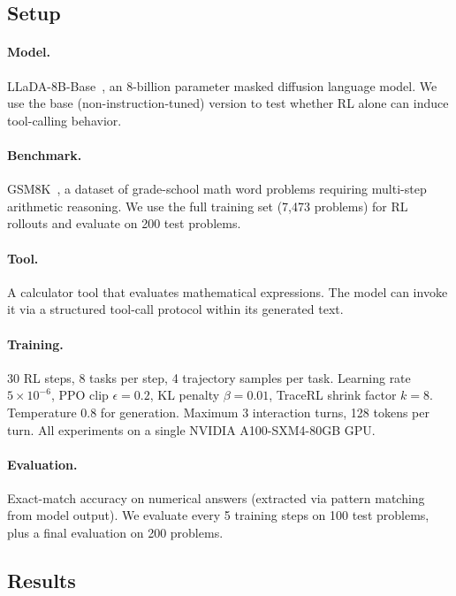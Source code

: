 \documentclass{article}
\begin{document}
\subsection{Setup}

\paragraph{Model.} LLaDA-8B-Base~\citep{nie2025llada}, an 8-billion parameter masked diffusion language model. We use the base (non-instruction-tuned) version to test whether RL alone can induce tool-calling behavior.

\paragraph{Benchmark.} GSM8K~\citep{cobbe2021gsm8k}, a dataset of grade-school math word problems requiring multi-step arithmetic reasoning. We use the full training set (7,473 problems) for RL rollouts and evaluate on 200 test problems.

\paragraph{Tool.} A calculator tool that evaluates mathematical expressions. The model can invoke it via a structured tool-call protocol within its generated text.

\paragraph{Training.} 30 RL steps, 8 tasks per step, 4 trajectory samples per task. Learning rate $5\times10^{-6}$, PPO clip $\epsilon=0.2$, KL penalty $\beta=0.01$, TraceRL shrink factor $k=8$. Temperature 0.8 for generation. Maximum 3 interaction turns, 128 tokens per turn. All experiments on a single NVIDIA A100-SXM4-80GB GPU.

\paragraph{Evaluation.} Exact-match accuracy on numerical answers (extracted via pattern matching from model output). We evaluate every 5 training steps on 100 test problems, plus a final evaluation on 200 problems.

\subsection{Results}
\end{document}
